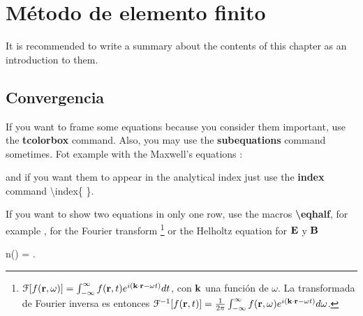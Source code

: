 
\chapter{Método de elemento finito}
\label{chapter:theory}

\vspace*{7em}

It is recommended to write a summary about the contents of this chapter as an introduction to them. 

\blindtext

\section{Convergencia}
\label{section:basics}

If you want to frame some equations because you consider them important, use the \textbf{tcolorbox} command. Also, you may use the \textbf{subequations} command sometimes. Fot example with the Maxwell's equations \cite{griffiths2013electrodynamics}:\vspace*{-.75em}

and if you want them to appear in the analytical index just use the \textbf{index} command \textbackslash index\{ \}.

If you want to show two equations in only one row, use the macros \textbf{\textbackslash eqhalf}, for example\cite{hecht1998optics} , for the Fourier transform \footnote{ $\mathcal{F}[f(\vb{r},\omega)] = \int_{-\infty}^\infty f(\vb{r},t) e^{i(\vb{k}\cdot\vb{r} -\omega t)} dt$, con $\vb{k}$ una función de $\omega$. La transformada de Fourier inversa es entonces $\mathcal{F}^{-1}[f(\vb{r},t)] =\frac{1}{2\pi} \int_{-\infty}^\infty f(\vb{r},\omega) e^{i(\vb{k}\cdot\vb{r} -\omega t)} d\omega$.} or the Helholtz equation  for $\vb{E}$ y $\vb{B}$ \cite{griffiths2013electrodynamics}


\noindent \blindtext \vspace*{-.75em}
%
	\begin{tcolorbox}[title = Índice de refracción, ams align]
	n(\omega) = .
		\label{eq:indice} 
	\end{tcolorbox}\vspace*{-.75em}


